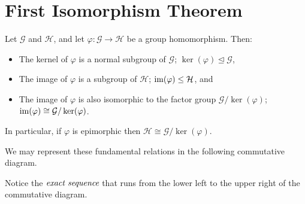 
\section{First Isomorphism Theorem} %
\label{sec:firstisomorphismtheorem}

\begin{defn}
Let $\mathcal{G}$ and $\mathcal{H}$, and let
$\varphi : \mathcal{G} \to \mathcal{H}$ be a group homomorphism.
Then:
\begin{itemize}
	\item The kernel of $\varphi$ is a normal subgroup of $\mathcal{G}$;
		$\ker(\varphi) \unlhd \mathcal{G}$,
	\item The image of $\varphi$ is a subgroup of $\mathcal{H}$;
		$\operatorname{im}(\varphi) \leq \mathcal{H}$, and
	\item The image of $\varphi$ is also isomorphic to the factor group
		$\mathcal{G} / \ker(\varphi)$;
		$\operatorname{im}(\varphi) \cong \mathcal{G} / \ker(\varphi)$.
\end{itemize}
In particular, if $\varphi$ is epimorphic then
$\mathcal{H} \cong \mathcal{G} / \ker(\varphi)$.
\end{defn}

We may represent these fundamental relations in the following commutative diagram.


Notice the $\emph{exact sequence}$ that runs from the lower left to the upper right of the commutative diagram.
